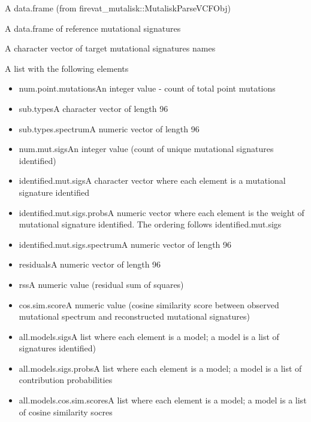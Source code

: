 \documentclass[letterpaper]{book}
\begin{document}
%
\begin{Arguments}
\begin{ldescription}
\item[\code{vcf.trinucleotide.data}] A data.frame (from firevat\_mutalisk::MutaliskParseVCFObj)

\item[\code{df.ref.mut.sigs}] A data.frame of reference mutational signatures

\item[\code{target.mut.sigs}] A character vector of target mutational signatures names
\end{ldescription}
\end{Arguments}
%
\begin{Value}
A list with the following elements
\begin{itemize}

\item{} num.point.mutationsAn integer value - count of total point mutations
\item{} sub.typesA character vector of length 96
\item{} sub.types.spectrumA numeric vector of length 96
\item{} num.mut.sigsAn integer value (count of unique mutational signatures identified)
\item{} identified.mut.sigsA character vector where each element is a mutational signature identified
\item{} identified.mut.sigs.probsA numeric vector where each element is the weight of mutational signature identified.
The ordering follows identified.mut.sigs
\item{} identified.mut.sigs.spectrumA numeric vector of length 96
\item{} residualsA numeric vector of length 96
\item{} rssA numeric value (residual sum of squares)
\item{} cos.sim.scoreA numeric value (cosine similarity score between observed mutational spectrum and
reconstructed mutational signatures)
\item{} all.models.sigsA list where each element is a model; a model is a list of signatures identified)
\item{} all.models.sigs.probsA list where each element is a model; a model is a list of contribution probabilities
\item{} all.models.cos.sim.scoresA list where each element is a model; a model is a list of cosine similarity socres

\end{itemize}

\end{Value}
\end{document}
